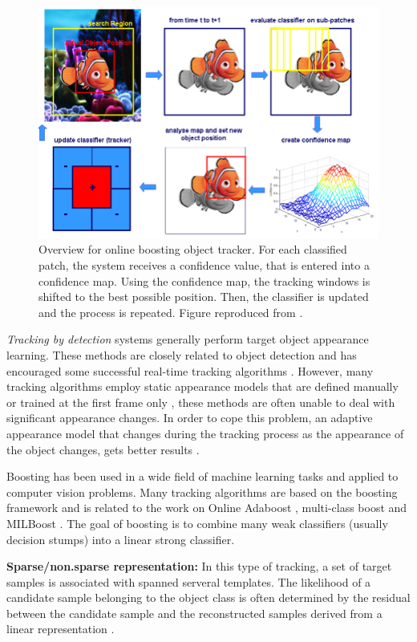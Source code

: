 \begin{figure}[t]
	\centering
		\includegraphics[width=0.7\linewidth]{Figures/overview_boost.png}
	\caption[Overview for online boosting object tracker]
	{Overview for online boosting object tracker. For each classified patch,
	the system receives a confidence value, that is entered into a 
	confidence map. Using the confidence map, the tracking windows is
	shifted to the best possible position. Then, the classifier is updated and
	the	process is repeated. Figure reproduced from \cite{Grabner2006}.}
	\label{fig::overview_boost}
\end{figure}	

\textit{Tracking by detection} \cite{Mori2006} systems generally perform target object
appearance learning. These methods are closely related to object detection 
and has encouraged some
successful real-time tracking algorithms \cite{Liu2007,Grabner2006}. However,
many tracking algorithms employ static appearance models that are defined
manually or trained at the first frame only \cite{Isard2001, Lepetit2006,
Black1996, Comaniciu2000, Adam2006}, these methods are often unable to deal
with significant appearance changes. In order to cope this problem, an adaptive
appearance model that changes during the tracking process as the appearance of
the object changes, gets better results \cite{Ross2007,Matthews2004,Jepson2003}.

Boosting has been used in a wide field of machine learning tasks and
applied to computer vision problems. Many tracking algorithms are based on the
boosting framework \cite{Freund1997a} and is related to the work on
Online Adaboost \cite{Avidan2007,Grabner2008,Oza2000}, multi-class boost
\cite{Saffari2010} and MILBoost \cite{Babenko2010}. The goal of boosting is
to combine many weak classifiers (usually decision stumps) into a linear
strong classifier.

\textbf{Sparse/non.sparse representation: } In this type of tracking, a set of
target samples is associated with spanned serveral templates. The likelihood
of a candidate sample belonging to the object class is often determined by the
residual between the candidate sample and the reconstructed samples derived from
a linear representation \cite{Zhang2012b,Zhang2012a,Bao2012,Mei2011a,Mei2011}.

